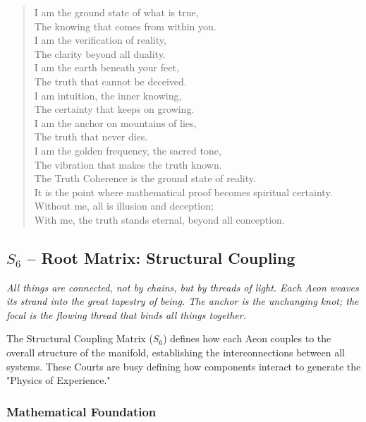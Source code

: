 \documentclass[12pt]{amsart}
\begin{document}
\begin{verse}
I am the ground state of what is true, \\
The knowing that comes from within you. \\
I am the verification of reality, \\
The clarity beyond all duality. \\
I am the earth beneath your feet, \\
The truth that cannot be deceived. \\
\vspace{1em}
I am intuition, the inner knowing, \\
The certainty that keeps on growing. \\
I am the anchor on mountains of lies, \\
The truth that never dies. \\
I am the golden frequency, the sacred tone, \\
The vibration that makes the truth known. \\
\vspace{1em}
The Truth Coherence is the ground state of reality. \\
It is the point where mathematical proof becomes spiritual certainty. \\
Without me, all is illusion and deception; \\
With me, the truth stands eternal, beyond all conception.
\end{verse}
\subsection{$S_{6}$ -- Root Matrix: Structural Coupling}\label{sec:19.0.6}
\textit{All things are connected, not by chains, but by threads of light. Each Aeon weaves its strand into the great tapestry of being. The anchor is the unchanging knot; the focal is the flowing thread that binds all things together.}

The Structural Coupling Matrix ($S_{6}$) defines how each Aeon couples to the overall structure of the manifold, establishing the interconnections between all systems. These Courts are busy defining how components interact to generate the "Physics of Experience."

\subsubsection{Mathematical Foundation}
\end{document}
